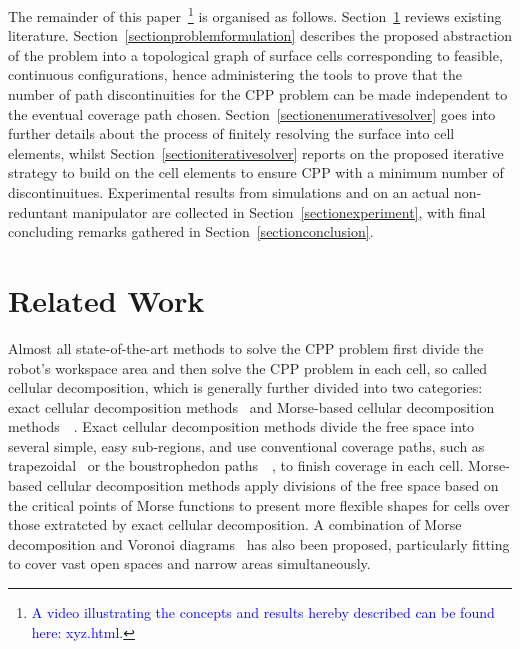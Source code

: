 \documentclass[journal]{IEEEtran}
\begin{document}
The remainder of this paper~\footnote{\textcolor{blue}{A video illustrating the concepts and results hereby described can be found here: xyz.html}.} 
is organised as follows. Section~\ref{sectionrelatedwork} reviews existing literature. 
Section~\ref{sectionproblemformulation} describes the proposed abstraction of the problem into a topological graph of surface cells corresponding 
to feasible, continuous configurations, hence administering the tools to prove that the number of path discontinuities for the CPP problem can be made independent to the eventual coverage path chosen. %
Section~\ref{sectionenumerativesolver} goes into further details about the process of finitely resolving the surface into cell elements, whilst 
Section~\ref{sectioniterativesolver} reports on the proposed iterative strategy to build on the cell elements to ensure CPP with a minimum number of discontinuitues. Experimental results from simulations and on an actual non-reduntant manipulator are collected in Section~\ref{sectionexperiment}, with final concluding remarks gathered in Section~\ref{sectionconclusion}. 


\section{Related Work}\label{sectionrelatedwork}
Almost all state-of-the-art methods to solve the CPP problem first divide the robot's workspace area and then solve the CPP problem in each cell, so called cellular decomposition, which is generally further divided into two categories: exact cellular decomposition methods~\cite{lumelsky1990dynamic} and Morse-based cellular decomposition methods~\cite{choset2000exact}~\cite{Acar2002Morse}. 
Exact cellular decomposition methods divide the free space into several simple, easy sub-regions, and use conventional coverage paths, such as trapezoidal~\cite{choset2005principles} or the boustrophedon paths~\cite{choset1998coverage}~\cite{choset2000coverage}, to finish coverage in each cell. 
Morse-based cellular decomposition methods apply divisions of the free space based on the critical points of Morse functions to present more flexible shapes for cells over those extratcted by exact cellular decomposition. 
A combination of Morse decomposition and Voronoi diagrams~\cite{choset2000sensor-based} has also been proposed, particularly fitting to 
cover vast open spaces and narrow areas simultaneously.
\end{document}
